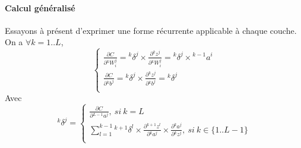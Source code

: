 \documentclass[a4paper, 10pt]{report}
\newcommand{\lexp}[1]{\phantom{}^{#1}}
\newcommand{\elem}[4]{\lexp{#2}#1^{#3}_{#4}}
\begin{document}
\paragraph{Calcul généralisé}
Essayons à présent d'exprimer une forme récurrente applicable à chaque couche.
On a $\forall k = 1..L$,
$$\left\{
\begin{array}{l}
	\frac{\partial C}{\partial \elem{W}{k}{j}{i}} = \elem{\delta}{k}{j}{} \times \frac{\partial \elem{z}{k}{j}{}}{\partial \elem{W}{k}{j}{i}} = \elem{\delta}{k}{j}{} \times \elem{a}{k-1}{i}{} 
	\\                                                                                                                                                                                        
	\frac{\partial C}{\partial \elem{b}{k}{j}{}} = \elem{\delta}{k}{j}{} \times \frac{\partial \elem{z}{k}{j}{}}{\partial \elem{b}{k}{j}{}} = \elem{\delta}{k}{j}{}                             
	\\                                                                                                                                                                                        
\end{array}
\right.$$
Avec $$\elem{\delta}{k}{j}{} = \left\{
\begin{array}{l}
	\frac{\partial C}{\partial \elem{a}{L-1}{j}{}}, \  si \ k=L                                                                                                                                                  
	\\                                                                                                                                                                                                         
	\sum_{l=1}^{k-1}{\elem{\delta}{k+1}{l}{} \times \frac{\partial \elem{z}{k+1}{l}{}}{\partial \elem{a}{k}{j}{}} \times \frac{\partial \elem{a}{k}{j}{}}{\partial \elem{z}{k}{j}{}}}, \ si \ k \in \{1 .. L-1\}
	\\
\end{array}
\right.$$
				
\end{document}
